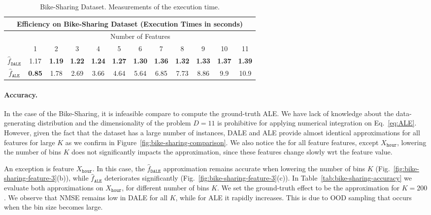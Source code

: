 \documentclass[wcp]{jmlr}
\newcommand{\dale}{\hat{f}_{\mathtt{DALE}}}
\newcommand{\alep}{\hat{f}_{\mathtt{ALE}}}
\begin{document}
\begin{table}
  \caption{Bike-Sharing Dataset. Measurements of the execution time.}
  \label{tab:bike-sharing-efficiency}
  \centering
  \begin{tabular}{c|c|c|c|c|c|c|c|c|c|c|c}
    \multicolumn{12}{c}{Efficiency on Bike-Sharing Dataset (Execution Times in seconds)} \\
    \hline\hline
    & \multicolumn{11}{|c}{Number of Features} \\
    \hline
    & 1 & 2 & 3 & 4 & 5 & 6 & 7 & 8 & 9 & 10 & 11 \\
    \hline
    \( \dale \) & 1.17 & \textbf{1.19} & \textbf{1.22} & \textbf{1.24} & \textbf{1.27} & \textbf{1.30} & \textbf{1.36} & \textbf{1.32} & \textbf{1.33} & \textbf{1.37} & \textbf{1.39} \\
    \hline
    \( \alep \) & \textbf{0.85} & 1.78 & 2.69 & 3.66 & 4.64 & 5.64 & 6.85 & 7.73 & 8.86 & 9.9 & 10.9 \\
    \hline
  \end{tabular}
\end{table}

\paragraph{Accuracy.}

In the case of the Bike-Sharing, it is infeasible compare to compute
the ground-truth ALE. We have lack of knowledge about the
data-generating distribution and the dimensionality of the problem
\(D=11\) is prohibitive for applying numerical integration on
Eq.~\eqref{eq:ALE}. However, given the fact that the dataset has a
large number of instances, DALE and ALE provide almost identical
approximations for all features for large \(K\) as we confirm in
Figure~\ref{fig:bike-sharing-comparison}. We also notice the for all
feature features, except \(X_{\mathtt{hour}}\), lowering the number of
bins \(K\) does not significantly impacts the approximation, since
these features change slowly wrt the feature value.

An exception is feature \(X_{\mathtt{hour}}\). In this case, the
\(\dale\) approximation remains accurate when lowering the
number of bins \(K\) (Fig.~\ref{fig:bike-sharing-feature-3}(b)), while
\(\hat{f}_{\mathtt{ALE}}\) deteriorates significantly
(Fig.~\ref{fig:bike-sharing-feature-3}(c)). In
Table~\ref{tab:bike-sharing-accuracy} we evaluate both approximations
on \(X_{\mathtt{hour}}\), for different number of bins \(K\). We set
the ground-truth effect to be the approximation for \(K=200\). We
observe that NMSE remains low in DALE for all \(K\), while for ALE it
rapidly increases. This is due to OOD sampling that occurs when the
bin size becomes large.
\end{document}
